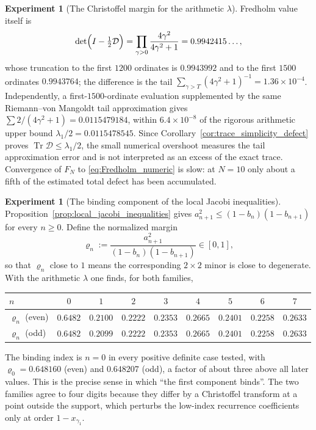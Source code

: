 \documentclass[11pt]{amsart}
\numberwithin{equation}{section}
\theoremstyle{plain}
\theoremstyle{definition}
\newtheorem{experiment}[theorem]{Experiment}
\theoremstyle{remark}
\newcommand{\Tr}{\operatorname{Tr}}
\begin{document}
\begin{experiment}[The Christoffel margin for the arithmetic $\lambda$]
Fredholm value itself is
\begin{equation}
 \det\Bigl(I-\tfrac12\mathcal D\Bigr)
 =\prod_{\gamma>0}\frac{4\gamma^2}{4\gamma^2+1}
 =0.9942415\ldots,
 \label{eq:Fredholm_numeric}
\end{equation}
whose truncation to the first $1200$ ordinates is $0.9943992$ and to the first $1500$
ordinates $0.9943764$; the difference is the tail
$\sum_{\gamma>T}(4\gamma^2+1)^{-1}=1.36\times10^{-4}$.  Independently, a first-$1500$-ordinate evaluation supplemented by the same
Riemann--von Mangoldt tail approximation gives
$\sum 2/(4\gamma^2+1)=0.0115479184$, within $6.4\times10^{-8}$ of the rigorous arithmetic
upper bound $\lambda_1/2=0.0115478545$.  Since Corollary~\ref{cor:trace_simplicity_defect}
proves $\Tr\mathcal D\le\lambda_1/2$, the small numerical overshoot measures the tail
approximation error and is not interpreted as an excess of the exact trace.  Convergence
of $F_N$ to \eqref{eq:Fredholm_numeric} is slow: at $N=10$ only about a fifth of the
estimated total defect has been accumulated.
\end{experiment}

\begin{experiment}[The binding component of the local Jacobi inequalities]
\label{exp:binding_component}
Proposition~\ref{prop:local_jacobi_inequalities} gives
$a_{n+1}^2\le(1-b_n)(1-b_{n+1})$ for every $n\ge0$.  Define the normalized margin
\begin{equation}
 \varrho_n:=\frac{a_{n+1}^2}{(1-b_n)(1-b_{n+1})}\in[0,1],
 \label{eq:local_jacobi_margin}
\end{equation}
so that $\varrho_n$ close to $1$ means the corresponding $2\times2$ minor is close to
degenerate.  With the arithmetic $\lambda$ one finds, for both families,
\begin{center}
\small
\begin{tabular}{lcccccccc}
\toprule
$n$ & $0$ & $1$ & $2$ & $3$ & $4$ & $5$ & $6$ & $7$\\
\midrule
$\varrho_n$ (even) & $0.6482$ & $0.2100$ & $0.2222$ & $0.2353$ & $0.2665$ & $0.2401$ & $0.2258$ & $0.2633$\\
$\varrho_n$ (odd)  & $0.6482$ & $0.2099$ & $0.2222$ & $0.2353$ & $0.2665$ & $0.2401$ & $0.2258$ & $0.2633$\\
\bottomrule
\end{tabular}
\end{center}
The binding index is $n=0$ in every positive definite case tested, with
$\varrho_0=0.648160$ (even) and $0.648207$ (odd), a factor of about three above all later
values.  This is the precise sense in which ``the first component binds''.  The two
families agree to four digits because they differ by a Christoffel transform at a point
outside the support, which perturbs the low-index recurrence coefficients only at order
$1-x_{\gamma_1}$.
\end{experiment}
\end{document}
